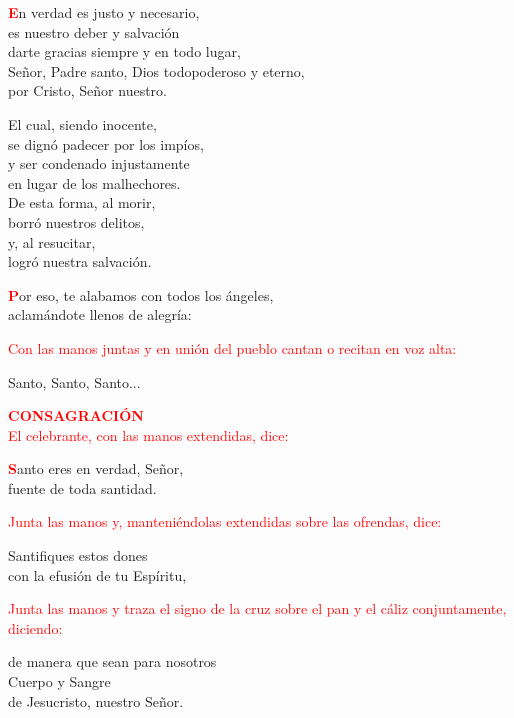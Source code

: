 \documentclass[12pt, letterpaper]{report}
\begin{document}
	\lettrine[lines=2]{\bfseries \textcolor{red}{E}}{}\Large n verdad es justo y necesario,\\
	es nuestro deber y salvación\\
	darte gracias siempre y en todo lugar,\\
	Señor, Padre santo, Dios todopoderoso y eterno,\\
	por Cristo, Señor nuestro.

	\noindent
	El cual, siendo inocente,\\
	se dignó padecer por los impíos,\\
	y ser condenado injustamente\\
	en lugar de los malhechores.\\
	De esta forma, al morir,\\
	borró nuestros delitos,\\
	y, al resucitar,\\
	logró nuestra salvación.

	\noindent
	\lettrine[lines=2]{\bfseries \textcolor{red}{P}}{}\Large or eso, te alabamos con todos los ángeles,\\
	aclamándote llenos de alegría:

	\large{\textcolor{red}{Con las manos juntas y en uni\'on del pueblo cantan o recitan en voz alta:}}

	\noindent
	\Large {Santo, Santo, Santo...}

	\Large {\bfseries \textcolor{red}{CONSAGRACI\'ON}}\\
	\large{\textcolor{red}{El celebrante, con las manos extendidas, dice:}}

	\lettrine[lines=2]{\bfseries \textcolor{red}{S}}{}\Large anto eres en verdad, Se\~nor,\\
	fuente de toda santidad.

	\newpage

	\large{\textcolor{red}{Junta las manos y, manteni\'endolas extendidas sobre las ofrendas, dice:}}

	\noindent
	\Large Santifiques estos dones\\
	con la efusi\'on de tu Esp\'iritu,

	\large{\textcolor{red}{Junta las manos y traza el signo de la cruz sobre el pan y el c\'aliz conjuntamente, diciendo:}}

	\noindent
	\Large de manera que sean para nosotros\\
	Cuerpo y \Huge{\textcolor{red}{}} \Large Sangre\\
	de Jesucristo, nuestro Se\~nor.
\end{document}
